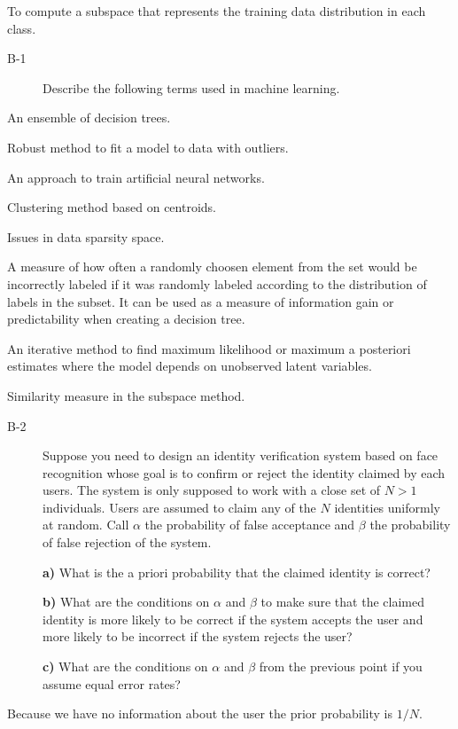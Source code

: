 \documentclass[10pt,a4paper]{article}
\newenvironment{prob}[1]%
   {%
    \begin{description}\item[#1]}%
   {\end{description}}
\begin{document}
To compute a subspace that represents the training data distribution
in each class.
\begin{prob}{B-1}
  Describe the following terms used in machine learning.
\end{prob}
\begin{description}[style=nextline]
\item[Random forests]
  An ensemble of decision trees.
\item[RANSAC]
  Robust method to fit a model to data with outliers.
\item[Dropout]
  An approach to train artificial neural networks.
\item[$k$-means]
  Clustering method based on centroids.
\item[Curse of dimensionality]
  Issues in data sparsity space.
\item[Gini impurity] A measure of how often a randomly choosen element
  from the set would be incorrectly labeled if it was randomly labeled
  according to the distribution of labels in the subset. It can be
  used as a measure of information gain or predictability when
  creating a decision tree.
\item[Expected maximization]
  An iterative method to find maximum likelihood or maximum a
  posteriori estimates where the model depends on unobserved latent
  variables.
\item[Projection length]
  Similarity measure in the subspace method.
\end{description}
\begin{prob}{B-2}
  Suppose you need to design an identity verification system based on
  face recognition whose goal is to confirm or reject the identity
  claimed by each users. The system is only supposed to work with a
  close set of $N > 1$ individuals. Users are assumed to claim any of
  the $N$ identities uniformly at random. Call $\alpha$ the
  probability of false acceptance and $\beta$ the probability of false
  rejection of the system.

  \textbf{a)} What is the a priori probability that the claimed
  identity is correct?

  \textbf{b)} What are the conditions on $\alpha$ and $\beta$ to make
  sure that the claimed identity is more likely to be correct if the
  system accepts the user and more likely to be incorrect if the
  system rejects the user?

  \textbf{c)} What are the conditions on $\alpha$ and $\beta$ from the
  previous point if you assume equal error rates?
\end{prob}
Because we have no information about the user the prior probability is
$1/N$.
\end{document}
